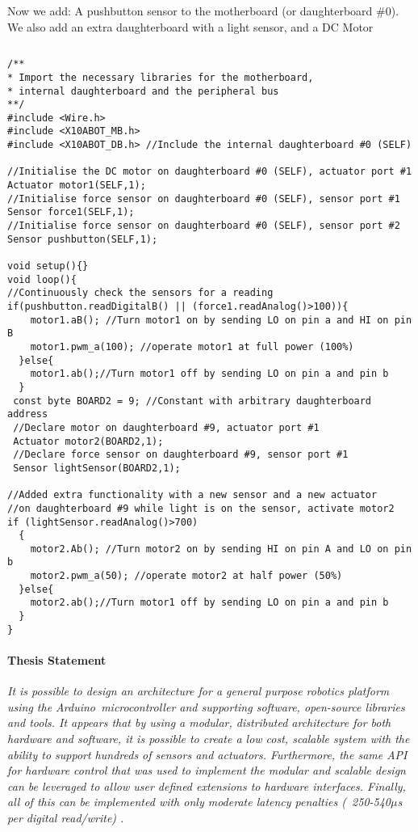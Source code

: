 \begin{listing}
		\footnotesize
		\caption{Now we add: A pushbutton sensor to the motherboard (or daughterboard \#0). We also add an extra daughterboard with a light sensor, and a DC Motor} \label{code:simplplus}
		\begin{verbatim}
        \end{verbatim}
        \begin{verbatim}
/**
* Import the necessary libraries for the motherboard, 
* internal daughterboard and the peripheral bus
**/
#include <Wire.h>  
#include <X10ABOT_MB.h>
#include <X10ABOT_DB.h> //Include the internal daughterboard #0 (SELF)

//Initialise the DC motor on daughterboard #0 (SELF), actuator port #1
Actuator motor1(SELF,1);
//Initialise force sensor on daughterboard #0 (SELF), sensor port #1
Sensor force1(SELF,1);
//Initialise force sensor on daughterboard #0 (SELF), sensor port #2
Sensor pushbutton(SELF,1);
   
void setup(){}
void loop(){
//Continuously check the sensors for a reading
if(pushbutton.readDigitalB() || (force1.readAnalog()>100)){
    motor1.aB(); //Turn motor1 on by sending LO on pin a and HI on pin B
    motor1.pwm_a(100); //operate motor1 at full power (100%) 
  }else{
    motor1.ab();//Turn motor1 off by sending LO on pin a and pin b
  }
 const byte BOARD2 = 9; //Constant with arbitrary daughterboard address
 //Declare motor on daughterboard #9, actuator port #1
 Actuator motor2(BOARD2,1);
 //Declare force sensor on daughterboard #9, sensor port #1
 Sensor lightSensor(BOARD2,1);
 
//Added extra functionality with a new sensor and a new actuator
//on daughterboard #9 while light is on the sensor, activate motor2
if (lightSensor.readAnalog()>700)
  {
    motor2.Ab(); //Turn motor2 on by sending HI on pin A and LO on pin b
    motor2.pwm_a(50); //operate motor2 at half power (50%)
  }else{
    motor2.ab();//Turn motor1 off by sending LO on pin a and pin b
  }
}	 
	\end{verbatim}
		
\end{listing}

\paragraph*{Thesis Statement}
\textit{It is possible to design an architecture for a general purpose robotics platform using the Arduino\texttrademark\ microcontroller and supporting software, open-source libraries and tools. It appears that by using a modular, distributed architecture for both hardware and software, it is possible to create a low cost, scalable system with the ability to support hundreds of sensors and actuators. Furthermore, the same API for hardware control that was used to implement the modular and scalable design can be leveraged to allow user defined extensions to hardware interfaces. Finally, all of this can be implemented with only moderate latency penalties (~250-540$\mu$s per digital read/write) .} 


